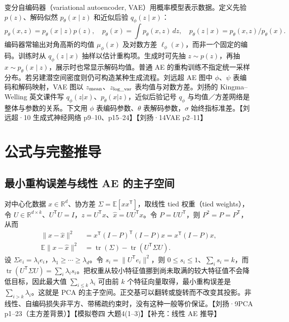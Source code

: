 \documentclass[UTF8,a4paper,zihao=-4,fontset=fandol]{ctexrep}
\begin{document}
变分自编码器（variational autoencoder, VAE）用概率模型表示数据。定义先验 $p(z)$、解码似然 $p_\theta(x\mid z)$ 和近似后验 $q_\phi(z\mid x)$：
\[
 p_\theta(x,z)=p_\theta(x\mid z)p(z),\quad
 p_\theta(x)=\int p_\theta(x,z)\,dz,\quad
 p_\theta(z\mid x)=p_\theta(x,z)/p_\theta(x).
\]
编码器常输出对角高斯的均值 $\mu_\phi(x)$ 及对数方差 $\ell_\phi(x)$，而非一个固定的编码。训练时从 $q_\phi(z\mid x)$ 抽样以估计重构项。生成时可先抽 $z\sim p(z)$，再抽 $x\sim p_\theta(x\mid z)$，展示时也常显示解码均值。普通 AE 的重构训练不指定统一采样分布。若另建潜空间密度则仍可构造某种生成流程。刘远超 AE 图中 $\phi$、$\psi$ 表编码和解码映射，VAE 图以 $z_{\rm mean}$、$z_{\rm log\_var}$ 表均值与对数方差。刘扬的 Kingma--Welling 英文课件写 $q_\phi(z|x)$、$p_\theta(x|z)$，近似后验记号 $q_\phi$ 与均值／方差网络是整体与参数的关系。下文用 $\phi$ 表编码参数、$\theta$ 表解码参数，$\sigma$ 始终指标准差。【刘远超·10 生成式神经网络 p9--10、p15--24】【刘扬·14VAE p2--11】

\section{公式与完整推导}

\subsection*{最小重构误差与线性 AE 的主子空间}

对中心化数据 $x\in\mathbb R^d$、协方差 $\Sigma=\mathbb E[xx^{\mathsf T}]$，取线性 tied 权重（tied weights），令 $U\in\mathbb R^{d\times k}$、$U^{\mathsf T}U=I$，$z=U^{\mathsf T}x$、$\widehat x=UU^{\mathsf T}x$。令 $P=UU^{\mathsf T}$，则 $P^2=P=P^{\mathsf T}$，从而
\begin{align*}
 \|x-\widehat x\|^2
 &=x^{\mathsf T}(I-P)^{\mathsf T}(I-P)x
 =x^{\mathsf T}(I-P)x,\\
 \mathbb E\|x-\widehat x\|^2
 &=\operatorname{tr}(\Sigma)-\operatorname{tr}(U^{\mathsf T}\Sigma U).
\end{align*}
设 $\Sigma e_i=\lambda_i e_i$，$\lambda_1\ge\cdots\ge\lambda_d$。令 $s_i=\|U^{\mathsf T}e_i\|^2$，则 $0\le s_i\le1$、$\sum_i s_i=k$，而 $\operatorname{tr}(U^{\mathsf T}\Sigma U)=\sum_i\lambda_i s_i$。把权重从较小特征值挪到尚未取满的较大特征值不会降低目标，因此最大值 $\sum_{i\le k}\lambda_i$ 可由前 $k$ 个特征向量取得，最小重构误差是 $\sum_{i>k}\lambda_i$。这就是 PCA 的主子空间。正交基可以翻转或旋转而不改变其投影。非线性、自编码损失非平方、带稀疏约束时，没有这种一般等价保证。【刘扬·9PCA p1--23（主方差背景）】【模拟卷四 大题4(1--3)】【补充：线性 AE 推导】
\end{document}
